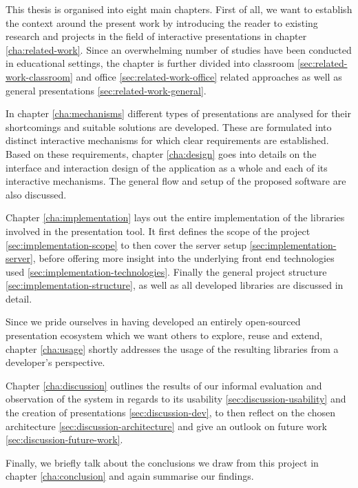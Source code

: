 This thesis is organised into eight main chapters. First of all, we want to establish the context around the present work by introducing the reader to existing research and projects in the field of interactive presentations in chapter \ref{cha:related-work}. Since an overwhelming number of studies have been conducted in educational settings, the chapter is further divided into classroom \ref{sec:related-work-classroom} and office \ref{sec:related-work-office} related approaches as well as general presentations \ref{sec:related-work-general}.

In chapter \ref{cha:mechanisms} different types of presentations are analysed for their shortcomings and suitable solutions are developed. These are formulated into distinct interactive mechanisms for which clear requirements are established.
Based on these requirements, chapter \ref{cha:design} goes into details on the interface and interaction design of the application as a whole and each of its interactive mechanisms. The general flow and setup of the proposed software are also discussed.

Chapter \ref{cha:implementation} lays out the entire implementation of the libraries involved in the presentation tool. It first defines the scope of the project \ref{sec:implementation-scope} to then cover the server setup \ref{sec:implementation-server}, before offering more insight into the underlying front end technologies used \ref{sec:implementation-technologies}. Finally the general project structure \ref{sec:implementation-structure}, as well as all developed libraries are discussed in detail.

Since we pride ourselves in having developed an entirely open-sourced presentation ecosystem which we want others to explore, reuse and extend, chapter \ref{cha:usage} shortly addresses the usage of the resulting libraries from a developer's perspective.

Chapter \ref{cha:discussion} outlines the results of our informal evaluation and observation of the system in regards to its usability \ref{sec:discussion-usability} and the creation of presentations \ref{sec:discussion-dev}, to then reflect on the chosen architecture \ref{sec:discussion-architecture} and give an outlook on future work \ref{sec:discussion-future-work}.

Finally, we briefly talk about the conclusions we draw from this project in chapter \ref{cha:conclusion} and again summarise our findings.